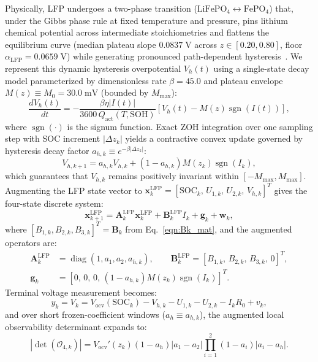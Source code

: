 \documentclass[11pt,a4paper]{article}
\begin{document}
Physically, LFP undergoes a two-phase transition ($\text{LiFePO}_4 \leftrightarrow \text{FePO}_4$) that, under the Gibbs phase rule at fixed temperature and pressure, pins lithium chemical potential across intermediate stoichiometries and flattens the equilibrium curve (median plateau slope $0.0837\;\mathrm{V}$ across $z\in[0.20,0.80]$, floor $\alpha_{\text{LFP}} = 0.0659\;\mathrm{V}$) while generating pronounced path-dependent hysteresis~\cite{Roscher2011hysteresis,Verbrugge2004hysteresis}. We represent this dynamic hysteresis overpotential $V_h(t)$ using a single-state decay model parameterized by dimensionless rate $\beta = 45.0$ and plateau envelope $M(z) \equiv M_0 = 30.0\;\mathrm{mV}$ (bounded by $M_{\max}$):
\begin{equation}\label{eqn:hysteresis_diff}
\frac{d V_h(t)}{dt} = -\frac{\beta \eta |I(t)|}{3600\,Q_{\text{act}}(T, \text{SOH})} \left[ V_h(t) - M(z) \operatorname{sgn}(I(t)) \right],
\end{equation}
where $\operatorname{sgn}(\cdot)$ is the signum function. Exact ZOH integration over one sampling step with SOC increment $|\Delta z_k|$ yields a contractive convex update governed by hysteresis decay factor $a_{h,k} \equiv e^{-\beta |\Delta z_k|}$:
\begin{equation}\label{eqn:hysteresis_discrete}
V_{h,k+1} = a_{h,k} V_{h,k} + \left(1 - a_{h,k}\right) M(z_k) \operatorname{sgn}(I_k),
\end{equation}
which guarantees that $V_{h,k}$ remains positively invariant within $[-M_{\max}, M_{\max}]$. Augmenting the LFP state vector to $\mathbf{x}_k^{\text{LFP}} = [\text{SOC}_k,\, U_{1,k},\, U_{2,k},\, V_{h,k}]^T$ gives the four-state discrete system:
\begin{equation}\label{eqn:x_lfp}
\mathbf{x}_{k+1}^{\text{LFP}} = \mathbf{A}_k^{\text{LFP}} \mathbf{x}_k^{\text{LFP}} + \mathbf{B}_k^{\text{LFP}} I_k + \mathbf{g}_k + \mathbf{w}_k,
\end{equation}
where $[B_{1,k}, B_{2,k}, B_{3,k}]^T = \mathbf{B}_k$ from Eq.~\eqref{eqn:Bk_mat}, and the augmented operators are:
\begin{align*}
\mathbf{A}_k^{\text{LFP}} &= \operatorname{diag}(1, a_1, a_2, a_{h,k}), \qquad
\mathbf{B}_k^{\text{LFP}} = [B_{1,k},\, B_{2,k},\, B_{3,k},\, 0]^T, \\
\mathbf{g}_k &= \left[0,\, 0,\, 0,\, (1 - a_{h,k}) M(z_k) \operatorname{sgn}(I_k)\right]^T.
\end{align*}
Terminal voltage measurement becomes:
\begin{equation}\label{eqn:vt_lfp}
y_k = V_k = V_{\text{ocv}}(\text{SOC}_k) - V_{h,k} - U_{1,k} - U_{2,k} - I_k R_0 + v_k,
\end{equation}
and over short frozen-coefficient windows ($a_h \equiv a_{h,k}$), the augmented local observability determinant expands to:
\begin{equation}\label{eqn:det_obs_lfp}
|\det(\mathcal{O}_{4,k})| = V_{\text{ocv}}'(z_k)(1 - a_h)|a_1 - a_2|\prod_{i=1}^2 (1 - a_i)|a_i - a_h|.
\end{equation}
\end{document}
